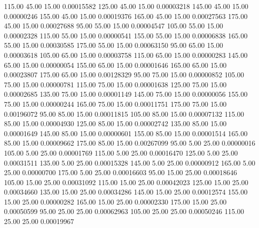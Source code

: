     115.00     45.00     15.00     0.00015582
    125.00     45.00     15.00     0.00003218
    145.00     45.00     15.00     0.00000246
    155.00     45.00     15.00     0.00019376
    165.00     45.00     15.00     0.00027563
    175.00     45.00     15.00     0.00027688
     95.00     55.00     15.00     0.00004547
    105.00     55.00     15.00     0.00002328
    115.00     55.00     15.00     0.00000541
    155.00     55.00     15.00     0.00006838
    165.00     55.00     15.00     0.00030585
    175.00     55.00     15.00     0.00063150
     95.00     65.00     15.00     0.00003618
    105.00     65.00     15.00     0.00003758
    115.00     65.00     15.00     0.00000283
    145.00     65.00     15.00     0.00000054
    155.00     65.00     15.00     0.00001646
    165.00     65.00     15.00     0.00023807
    175.00     65.00     15.00     0.00128329
     95.00     75.00     15.00     0.00000852
    105.00     75.00     15.00     0.00000781
    115.00     75.00     15.00     0.00001638
    125.00     75.00     15.00     0.00002685
    135.00     75.00     15.00     0.00001149
    145.00     75.00     15.00     0.00000056
    155.00     75.00     15.00     0.00000244
    165.00     75.00     15.00     0.00011751
    175.00     75.00     15.00     0.00196072
     95.00     85.00     15.00     0.00011815
    105.00     85.00     15.00     0.00007132
    115.00     85.00     15.00     0.00004930
    125.00     85.00     15.00     0.00002742
    135.00     85.00     15.00     0.00001649
    145.00     85.00     15.00     0.00000601
    155.00     85.00     15.00     0.00001514
    165.00     85.00     15.00     0.00009662
    175.00     85.00     15.00     0.00267099
     95.00      5.00     25.00     0.00000016
    105.00      5.00     25.00     0.00001769
    115.00      5.00     25.00     0.00016470
    125.00      5.00     25.00     0.00031511
    135.00      5.00     25.00     0.00015328
    145.00      5.00     25.00     0.00000912
    165.00      5.00     25.00     0.00000700
    175.00      5.00     25.00     0.00016603
     95.00     15.00     25.00     0.00018646
    105.00     15.00     25.00     0.00031092
    115.00     15.00     25.00     0.00042023
    125.00     15.00     25.00     0.00034660
    135.00     15.00     25.00     0.00034286
    145.00     15.00     25.00     0.00012574
    155.00     15.00     25.00     0.00000282
    165.00     15.00     25.00     0.00002330
    175.00     15.00     25.00     0.00050599
     95.00     25.00     25.00     0.00062963
    105.00     25.00     25.00     0.00050246
    115.00     25.00     25.00     0.00019967

